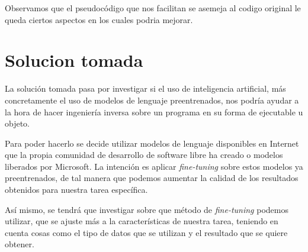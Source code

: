 Observamos que el pseudocódigo que nos facilitan se asemeja al codigo original le queda ciertos aspectos en los cuales podria mejorar.

\section{Solucion tomada}
\label{sec:solucion}


La solución tomada pasa por investigar si el uso de inteligencia artificial, más concretamente el uso de modelos de lenguaje preentrenados, nos podría ayudar a la hora de hacer
ingeniería inversa sobre un programa en su forma de ejecutable u objeto.

Para poder hacerlo se decide utilizar modelos de lenguaje disponibles en Internet que la propia comunidad de desarrollo de software libre ha creado o modelos liberados por Microsoft.
La intención es aplicar \textit{fine-tuning} sobre estos modelos ya preentrenados, de tal manera que podemos aumentar la calidad de los resultados obtenidos para nuestra
tarea específica.

Así mismo, se tendrá que investigar sobre que método de \textit{fine-tuning} podemos utilizar, que se ajuste más a la características de nuestra tarea, teniendo en cuenta cosas como el
tipo de datos que se utilizan y el resultado que se quiere obtener.
